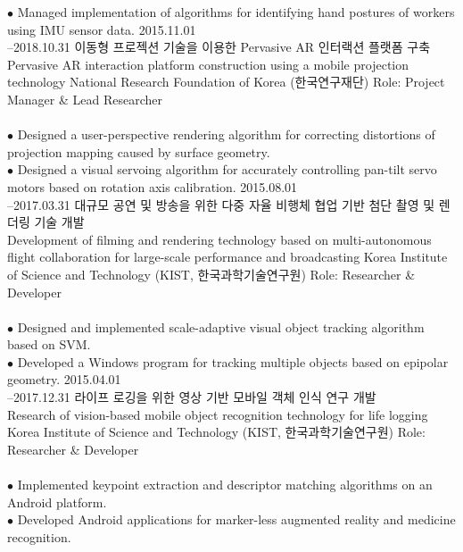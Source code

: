\documentclass[]{friggeri-cv}
\begin{document}
\begin{entrylist}
{    $\bullet$ Managed implementation of algorithms for identifying hand postures of workers using IMU sensor data.
    }
  \entry
    {2015.11.01\\--2018.10.31} 
    {이동형 프로젝션 기술을 이용한 Pervasive AR 인터랙션 플랫폼 구축\\
    Pervasive AR interaction platform construction using a mobile projection technology}
    {National Research Foundation of Korea (한국연구재단)}
    {Role: Project Manager \& Lead Researcher\\
    \\
    $\bullet$ Designed a user-perspective rendering algorithm for correcting distortions of projection mapping caused by surface geometry.\\
    $\bullet$ Designed  a visual servoing algorithm for accurately controlling pan-tilt servo motors based on rotation axis calibration.
    }
  \entry
    {2015.08.01\\--2017.03.31}
    {대규모 공연 및 방송을 위한 다중 자율 비행체 협업 기반 첨단 촬영 및 렌더링 기술 개발\\
    Development of filming and rendering technology based on multi-autonomous flight collaboration for large-scale performance and broadcasting}
    {Korea Institute of Science and Technology (KIST, 한국과학기술연구원)}
    {Role: Researcher \& Developer\\
    \\
    $\bullet$ Designed and implemented scale-adaptive visual object tracking algorithm based on SVM.\\
    $\bullet$ Developed a Windows program for tracking multiple objects based on epipolar geometry.
    }
  \entry
    {2015.04.01\\--2017.12.31}
    {라이프 로깅을 위한 영상 기반 모바일 객체 인식 연구 개발\\
    Research of vision-based mobile object recognition technology for life logging}
    {Korea Institute of Science and Technology (KIST, 한국과학기술연구원)}
    {Role: Researcher \& Developer\\
    \\
    $\bullet$ Implemented keypoint extraction and descriptor matching algorithms on an Android platform.\\
    $\bullet$ Developed Android applications for marker-less augmented reality and medicine recognition.
    }
\end{entrylist}
\end{document}

